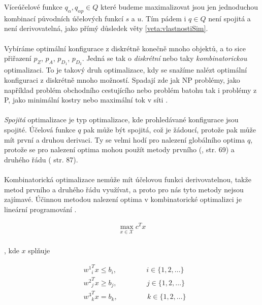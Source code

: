 Víceúčelové funkce $q_{\alpha}, q_{\alpha p} \in Q$ které budeme maximalizovat jsou jen jednoduchou kombinací původních účelových funkcí $s$ a $u$.
Tím pádem i $q \in Q$ není spojitá a není derivovatelná, jako přímý důsledek věty \ref{veta:vlastnostiSim}. 
\\
\\
Vybíráme optimální konfigurace z diskrétně konečně mnoho objektů, a to sice přiřazení $p_Z$, $p_A$, $p_{D_{1}}$, $p_{D_{2}}$.
Jedná se tak o \textit{diskrétní} nebo taky \textit{kombinatorickou} optimalizaci.
To je takový druh optimalizace, kdy se snažíme nalézt optimální konfiguraci z diskrétně mnoho možností.
Spadají zde jak NP problémy, jako například problém obchodního cestujícího nebo problém batohu tak i problémy z P, jako minimální kostry nebo maximální tok v síti \cite{CO}.
\\
\\
\textit{Spojitá} optimalizace je typ optimalizace, kde prohledávané konfigurace jsou spojité.
Účelová funkce $q$ pak může být spojitá, což je žádoucí, protože pak může mít první a druhou derivaci.
Ty se velmi hodí pro nalezení globálního optima $q$, protože se pro nalezení optima mohou použít metody prvního (\citet{AlgOptBook}, str. 69) a druhého řádu (\citet{AlgOptBook} str. 87).
\\
\\
Kombinatorická optimalizace nemůže mít účelovou funkci derivovatelnou, takže metod prvního a druhého řádu využívat, a proto pro nás tyto metody nejsou zajímavé.
Účinnou metodou nalezení optima v kombinatorické optimalizci je lineární programování \cite{LP}.

\begin{definice}
  \begin{align*}
    \max_{x \in \mathcal{X}} c^T x
  \end{align*}
  \\
  , kde $x$ splňuje

  \begin{align*}
    &{w^1}^T_i x \leq b_i, \hspace{50pt} i \in \{ 1, 2, \dots \} \\
    &{w^2}^T_j x \geq b_j, \hspace{50pt} j \in \{ 1, 2, \dots \} \\
    &{w^3}^T_k x = b_k,    \hspace{50pt} k \in \{ 1, 2, \dots \}
  \end{align*}
  \\
\end{definice}

